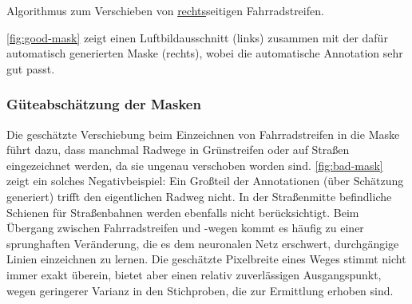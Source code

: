 \newcommand{\norm}[1]{\left\lVert#1\right\rVert}
\begin{algorithm}
	\caption{Algorithmus zum Verschieben von \underline{rechts}seitigen Fahrradstreifen.}\label{lst:move-strip}
	\begin{algorithmic}[1]
		 
				\State{$e \gets \frac{1}{\norm{ \Delta v}_2} \Delta v$}
				 
			\EndFor
		\EndProcedure
	\end{algorithmic}
\end{algorithm}

\autoref{fig:good-mask} zeigt einen Luftbildausschnitt (links) zusammen mit der dafür automatisch generierten Maske (rechts),
wobei die automatische Annotation sehr gut passt. 

\subsubsection{Güteabschätzung der Masken} \label{sec:quality-of-masks}

Die geschätzte Verschiebung beim Einzeichnen von Fahrradstreifen in die Maske führt dazu, dass manchmal Radwege in Grünstreifen oder auf Straßen eingezeichnet werden, da sie ungenau verschoben worden sind.
\autoref{fig:bad-mask} zeigt ein solches Negativbeispiel: Ein Großteil der Annotationen (über Schätzung generiert) trifft den eigentlichen Radweg nicht. 
In der Straßenmitte befindliche Schienen für Straßenbahnen werden ebenfalls nicht berücksichtigt.
Beim Übergang zwischen Fahrradstreifen und -wegen kommt es häufig zu einer sprunghaften Veränderung, die es dem neuronalen Netz erschwert, durchgängige Linien einzeichnen zu lernen.
Die geschätzte Pixelbreite eines Weges stimmt nicht immer exakt überein, bietet aber einen relativ zuverlässigen Ausgangspunkt, wegen geringerer Varianz in den Stichproben, 
die zur Ermittlung erhoben sind.

